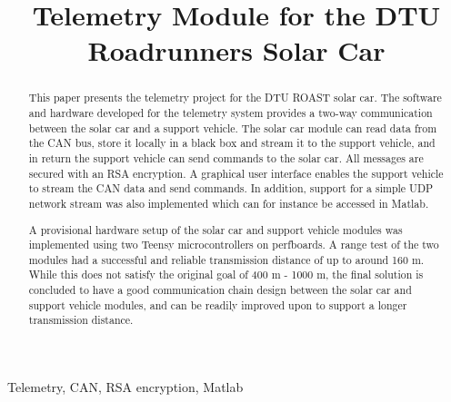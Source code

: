 \documentclass[a4paper,conference]{IEEEtran}
\begin{document}
\pagestyle{default}
\title{Telemetry Module for the DTU Roadrunners Solar Car}

\author{
}

\maketitle

\begin{abstract}
This paper presents the telemetry project for the DTU ROAST solar car. The software and hardware developed for the telemetry system provides a two-way communication between the solar car and a support vehicle. The solar car module can read data from the CAN bus, store it locally in a black box and stream it to the support vehicle, and in return the support vehicle can send commands to the solar car. All messages are secured with an RSA encryption. A graphical user interface enables the support vehicle to stream the CAN data and send commands. In addition, support for a simple UDP network stream was also implemented which can for instance be accessed in Matlab.

A provisional hardware setup of the solar car and support vehicle modules was implemented using two Teensy microcontrollers on perfboards. A range test of the two modules had a successful and reliable transmission distance of up to around 160 m. While this does not satisfy the original goal of 400 m - 1000 m, the final solution is concluded to have a good communication chain design between the solar car and support vehicle modules, and can be readily improved upon to support a longer transmission distance. 
\end{abstract}

\begin{IEEEkeywords}
Telemetry, CAN, RSA encryption, Matlab
\end{IEEEkeywords}
\end{document}
